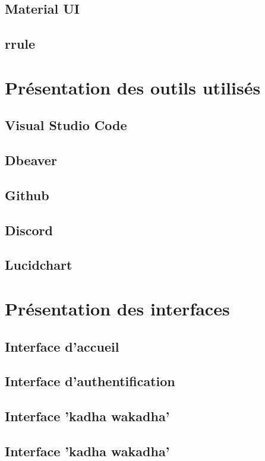     \subsection{Material UI}
    \subsection{rrule}

\section{Présentation des outils utilisés}
    \subsection{Visual Studio Code}
    \subsection{Dbeaver}
    \subsection{Github}
    \subsection{Discord}
    \subsection{Lucidchart}

\section{Présentation des interfaces}
    \subsection{Interface d'accueil}
    \subsection{Interface d'authentification}
    \subsection{Interface 'kadha wakadha'}
    \subsection{Interface 'kadha wakadha'}

